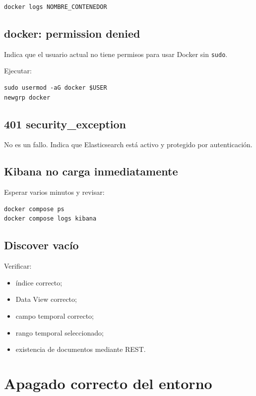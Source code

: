 \documentclass[
  coursetitle={Cómputo Nube y Tecnologías Emergentes},
  coursehours={96},
  coursedate={Verano 2026},
  doctype={Práctica},
  otherlangs={english,french},
  authorname={Lázaro},
  authorsurname={Bustio-Martínez},
  authortitle={PhD},
  role={Profesor Investigador},
  email={lbustio@inaoe.mx},
  phone={5559504000},
  ext={7459},
  institution={Instituto Nacional de Astrofísica, Óptica y Electrónica (INAOE)},
  department={Maestría en Ciencias en Tecnologías de Seguridad},
  address={Luis Enrique Erro 1, Sta. Ma. Tonantzintla, San Andrés Cholula, CP 72840, Puebla, México},
  margin={0.5in}
]{../../lbustio_lecture_notes}
\begin{document}
\begin{lstlisting}
docker logs NOMBRE_CONTENEDOR
\end{lstlisting}

\subsection{docker: permission denied}

Indica que el usuario actual no tiene permisos para usar Docker sin \texttt{sudo}.

Ejecutar:

\begin{lstlisting}
sudo usermod -aG docker $USER
newgrp docker
\end{lstlisting}

\subsection{401 security\_exception}

No es un fallo. Indica que Elasticsearch está activo y protegido por autenticación.

\subsection{Kibana no carga inmediatamente}

Esperar varios minutos y revisar:

\begin{lstlisting}
docker compose ps
docker compose logs kibana
\end{lstlisting}

\subsection{Discover vacío}

Verificar:

\begin{itemize}
    \item índice correcto;
    \item Data View correcto;
    \item campo temporal correcto;
    \item rango temporal seleccionado;
    \item existencia de documentos mediante REST.
\end{itemize}

\section{Apagado correcto del entorno}
\end{document}
